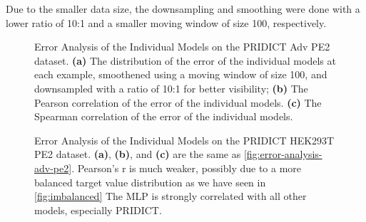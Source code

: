 Due to the smaller data size, the downsampling and smoothing were done with a lower ratio of 10:1 and a smaller moving window of size 100, respectively. 

\newpage

\begin{figure}[!htb]
    \centering
    \caption[Error Analysis of the Individual Models on PRIDICT Adv PE2 dataset]{Error Analysis of the Individual Models on the PRIDICT Adv PE2 dataset. \textbf{(a)} The distribution of the error of the individual models at each example, smoothened using a moving window of size 100, and downsampled with a ratio of 10:1 for better visibility; \textbf{(b)} The Pearson correlation of the error of the individual models. \textbf{(c)} The Spearman correlation of the error of the individual models.}
    \label{fig:error-analysis-adv-pe2}
\end{figure}
\newpage

\begin{figure}[!htb]
    \centering
    \caption[Error Analysis of the Individual Models on PRIDICT HEK293T PE2 dataset]{Error Analysis of the Individual Models on the PRIDICT HEK293T PE2 dataset. \textbf{(a)}, \textbf{(b)}, and \textbf{(c)} are the same as \autoref{fig:error-analysis-adv-pe2}. Pearson's r is much weaker, possibly due to a more balanced target value distribution as we have seen in \autoref{fig:imbalanced} The MLP is strongly correlated with all other models, especially PRIDICT.}
    \label{fig:error-analysis-hek293t-pe2}
\end{figure}
\newpage


